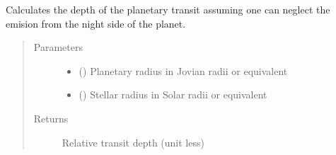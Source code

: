 \documentclass[a4paper,10pt,english]{sphinxmanual}
\begin{document}
\begin{fulllineitems}
\label{\detokenize{cascade.exoplanet_tools:cascade.exoplanet_tools.exoplanet_tools.TransitDepth}}
Calculates the depth of the planetary transit assuming one can
neglect the emision from the night side of the planet.
\begin{quote}\begin{description}
\item[{Parameters}] \leavevmode\begin{itemize}
\item {} 
 () \textendash{} Planetary radius in Jovian radii or equivalent

\item {} 
 () \textendash{} Stellar radius in Solar radii or equivalent

\end{itemize}

\item[{Returns}] \leavevmode
{} \textendash{} Relative transit depth (unit less)

\end{description}\end{quote}

\end{fulllineitems}

\end{document}
